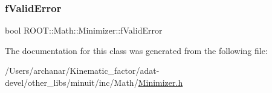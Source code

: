 \subsubsection{\texorpdfstring{fValidError}{fValidError}}
{\footnotesize\ttfamily bool R\+O\+O\+T\+::\+Math\+::\+Minimizer\+::f\+Valid\+Error\hspace{0.3cm}{\ttfamily [protected]}}



The documentation for this class was generated from the following file\+:\begin{DoxyCompactItemize}
\item 
/\+Users/archanar/\+Kinematic\+\_\+factor/adat-\/devel/other\+\_\+libs/minuit/inc/\+Math/\mbox{\hyperlink{adat-devel_2other__libs_2minuit_2inc_2Math_2Minimizer_8h}{Minimizer.\+h}}\end{DoxyCompactItemize}
